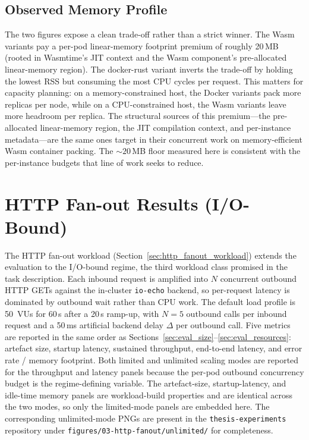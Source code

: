 \subsection{Observed Memory Profile}

The two figures expose a clean trade-off rather than a strict winner. The Wasm variants pay a per-pod linear-memory footprint premium of roughly 20\,MB (rooted in Wasmtime's \acs{JIT} context and the Wasm component's pre-allocated linear-memory region). The docker-rust variant inverts the trade-off by holding the lowest \acs{RSS} but consuming the most CPU cycles per request. This matters for capacity planning: on a memory-constrained host, the Docker variants pack more replicas per node, while on a \acs{CPU}-constrained host, the Wasm variants leave more headroom per replica. The structural sources of this premium---the pre-allocated linear-memory region, the JIT compilation context, and per-instance metadata---are the same ones \textcite{jansen2025memwasm} target in their concurrent work on memory-efficient \acs{Wasm} container packing. The ${\sim}20$\,MB floor measured here is consistent with the per-instance budgets that line of work seeks to reduce.

\section{HTTP Fan-out Results (I/O-Bound)}
\label{sec:eval_fanout}

\begin{sloppypar}
The HTTP fan-out workload (Section~\ref{sec:http_fanout_workload}) extends the evaluation to the I/O-bound regime, the third workload class promised in the task description. Each inbound request is amplified into $N$ concurrent outbound \acs{HTTP} GETs against the in-cluster \texttt{io-echo} backend, so per-request latency is dominated by outbound wait rather than \acs{CPU} work. The default load profile is 50~\acp{VU} for 60\,s after a 20\,s ramp-up, with $N=5$ outbound calls per inbound request and a 50\,ms artificial backend delay $\Delta$ per outbound call. Five metrics are reported in the same order as Sections~\ref{sec:eval_size}--\ref{sec:eval_resources}: artefact size, startup latency, sustained throughput, end-to-end latency, and error rate / memory footprint. Both limited and unlimited scaling modes are reported for the throughput and latency panels because the per-pod outbound concurrency budget is the regime-defining variable. The artefact-size, startup-latency, and idle-time memory panels are workload-build properties and are identical across the two modes, so only the limited-mode panels are embedded here. The corresponding unlimited-mode PNGs are present in the \texttt{thesis-experiments} repository under \texttt{figures/03-http-fanout/unlimited/} for completeness.
\end{sloppypar}

